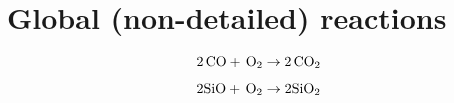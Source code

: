 \documentclass{article}
\title{}
\author{}
\date{\today,~ $ $Revision: 1.106 $ $}
\newcommand{\CO}{{\,\rm CO}}
\newcommand{\Ox}{{\,\rm O}}
\newcommand{\SiO}{{\rm SiO}}
\begin{document}

\section{Global (non-detailed) reactions}

\begin{equation}
2\CO+\Ox_2 \to 2\CO_2
\end{equation}

\begin{equation}
2\SiO+\Ox_2 \to 2\SiO_2
\end{equation}






\end{document}
